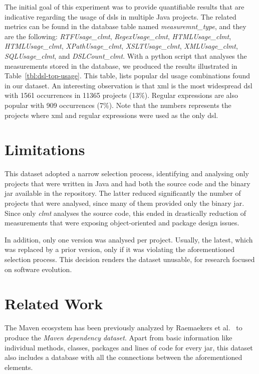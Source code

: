 \documentclass{sig-alternate}
\begin{document}
The initial goal of this experiment was to provide quantifiable results that are indicative regarding the usage of {\sc dsl}s in multiple Java projects. The related metrics can be found in the database table named \textit{measuremnt\_type}, and they are the following: \textit{RTFUsage\_clmt}, \textit{RegexUsage\_clmt},
\textit{HTMLUsage\_clmt}, \textit{HTMLUsage\_clmt}, \textit{XPathUsage\_clmt}, \textit{XSLTUsage\_clmt}, \textit{XMLUsage\_clmt}, \textit{SQLUsage\_clmt}, and \textit{DSLCount\_clmt}. With a python script that analyses the measurements stored in the database, we produced the results illustrated in Table~\ref{tbl:dsl-top-usage}. This table, lists popular {\sc dsl} usage combinations found in our dataset. An interesting observation is that {\sc xml} is the most widespread {\sc dsl} with 1561 occurrences in 11365 projects (13\%). Regular expressions are also popular with 909 occurrences (7\%). Note that the numbers represents the projects where {\sc xml} and regular expressions were used as the only {\sc dsl}.

\section{Limitations}
\label{sec:limit}

This dataset adopted a narrow selection process, identifying and analysing only projects that were written in Java and had both the source code and the binary {\sc jar} available in the repository. The latter reduced significantly the number of projects that were analysed, since many of them provided only the binary {\sc jar}. Since only \textit{clmt} analyses the source code, this ended in drastically reduction of measurements that were exposing object-oriented and package design issues.

In addition, only one version was analysed per project. Usually, the latest, which was replaced by a prior version, only if it was violating the aforementioned selection process. This decision renders the dataset unusable, for research focused on software evolution.

\section{Related Work}
\label{sec:rel}

The Maven ecosystem has been previously analyzed by Raemaekers et al.~\cite{RDV13} to produce the {\it Maven dependency dataset}. Apart from basic information like individual methods, classes, packages and lines of code for every {\sc jar}, this dataset also includes a database with all the connections between the aforementioned elements.
\end{document}
